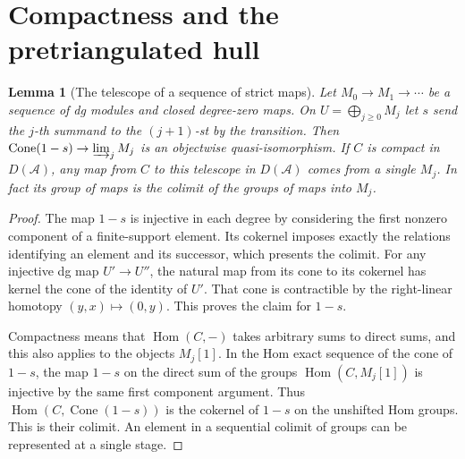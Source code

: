 \documentclass[11pt,oneside,openany]{book}
\newtheorem{lemma}[theorem]{Lemma}
\theoremstyle{definition}
\theoremstyle{remark}
\begin{document}
\section{Compactness and the pretriangulated hull}

\begin{lemma}[The telescope of a sequence of strict maps]\label{res:G09}
Let \(M_0\to M_1\to\cdots\) be a sequence of dg modules and closed
degree-zero maps. On \(U=\bigoplus_{j\geq0}M_j\) let \(s\) send
the \(j\)-th summand to the \((j+1)\)-st by the transition.
Then \(\operatorname{Cone}(1-s)\to\varinjlim_j M_j\) is an
objectwise quasi-isomorphism. If \(C\) is compact in
\(D(\mathcal A)\), any map from \(C\) to this telescope in
\(D(\mathcal A)\) comes from a single \(M_j\). In fact its group
of maps is the colimit of the groups of maps into \(M_j\).
\end{lemma}
\begin{proof}
The map \(1-s\) is injective in each degree by considering the
first nonzero component of a finite-support element. Its cokernel
imposes exactly the relations identifying an element and its
successor, which presents the colimit. For any injective dg map
\(U'\to U''\), the natural map from its cone to its cokernel
has kernel the cone of the identity of \(U'\). That cone is
contractible by the right-linear homotopy
\((y,x)\mapsto(0,y)\). This proves the claim for \(1-s\).

Compactness means that \(\operatorname{Hom}(C,-)\) takes arbitrary
sums to direct sums, and this also applies to the objects \(M_j[1]\).
In the Hom exact sequence of the cone of \(1-s\), the map
\(1-s\) on the direct sum of the groups
\(\operatorname{Hom}(C,M_j[1])\) is injective by the same first
component argument. Thus \(\operatorname{Hom}(C,\operatorname{Cone}(1-s))\)
is the cokernel of \(1-s\) on the unshifted Hom groups. This is
their colimit. An element in a sequential colimit of groups
can be represented at a single stage.
\end{proof}
\end{document}
